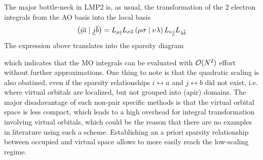 The major bottle-neck in LMP2 is, as usual, the transformation of the 2 electron integrals from the AO basis into the local basis
\begin{equation}
\left( \underline{i}\overline{a} \mid \underline{j}\overline{b} \right) = L_{\mu \underline{i}} L_{\sigma \overline{a}} \left( \mu\sigma \mid \nu\lambda \right) L_{\nu \underline{j}} L_{\lambda \overline{b}}
\end{equation}
\noindent The expression above translates into the sparsity diagram
\begin{center}
\end{center}
\noindent which indicates that the MO integrals can be evaluated with $\mathcal{O}(N^{2})$ effort without further approximations. One thing to note is that the quadratic scaling is also obatined, even if the sparsity relationships $i \leftrightarrow a$ and $j \leftrightarrow b$ did not exist, i.e. where virtual orbitals are localized, but not grouped into (apir) domains. The major disadavantage of such non-pair specific methods is that the virtual orbital space is less compact, which leads to a high overhead for integral transformation involving virtual orbitals, which could be the reason that there are no examples in literature using such a scheme. Establishing an a priori sparsity relationship between occupied and virtual space allows to more easily reach the low-scaling regime. 

